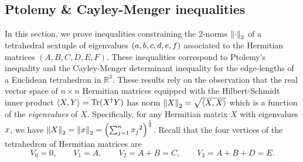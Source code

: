 \documentclass[notitlepage, 10pt]{article}
\begin{document}
\subsection{Ptolemy \& Cayley-Menger inequalities}

In this section, we prove inequalities constraining the $2$-norms $\left\lVert\cdot\right\rVert_{2}$ of a tetrahedral sextuple of eigenvalues $(a,b,c,d,e,f)$ associated to the Hermitian matrices $(A,B,C,D,E,F)$.
These inequalities correspond to Ptolemy's inequality and the Cayley-Menger determinant inequality for the edge-lengths of a Euclidean tetrahedron in $\mathbb R^3$.
These results rely on the observation that the real vector space of $n \times n$ Hermitian matrices equipped with the Hilbert-Schmidt inner product $\braket{X,Y} = \operatorname{Tr}(X^{\dagger} Y)$ has norm $\left\lVert X\right\rVert_2 = \sqrt{\braket{X,X}}$ which is a function of the \textit{eigenvalues} of $X$.
Specifically, for any Hermitian matrix $X$ with eigenvalues $x$, we have $\left\lVert X\right\rVert_2 = \left\lVert x\right\rVert_2 = \left(\sum_{j=1}^{n} {x_j}^2\right)^{\frac{1}{2}}$.
Recall that the four vertices of the tetrahedron of Hermitian matrices are
\begin{equation}
    V_0 = 0, \qquad V_1 = A, \qquad V_2 = A+B = C, \qquad V_3 = A+B+D = E.
\end{equation}
\end{document}
